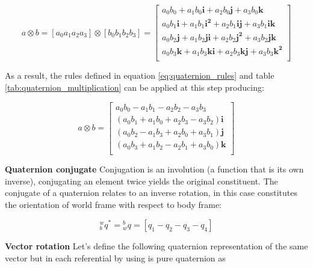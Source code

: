 \begin{equation}
    a \otimes b = \left[a_0 a_1 a_2 a_3\right] \otimes \left[b_0 b_1 b_2 b_3\right]     =
    \begin{bmatrix}
        a_0 b_0 + a_1 b_0\boldsymbol{i} + a_2 b_0\boldsymbol{j} + a_3 b_0\boldsymbol{k}                   \\
        a_0 b_1\boldsymbol{i} + a_1 b_1\boldsymbol{i^2} + a_2 b_1\boldsymbol{ij} + a_3 b_1\boldsymbol{ik} \\
        a_0 b_2\boldsymbol{j}+ a_1 b_2\boldsymbol{ji} + a_2 b_2\boldsymbol{j^2} + a_3 b_2\boldsymbol{jk}  \\
        a_0 b_3\boldsymbol{k} + a_1 b_3\boldsymbol{ki} + a_2 b_3\boldsymbol{kj} + a_3 b_3\boldsymbol{k^2} \\
    \end{bmatrix}
\end{equation}

As a result, the rules defined in equation \ref{eq:quaternion_rules} and table \ref{tab:quaternion_multiplication} can be applied at this step producing:

\begin{equation}
    a \otimes b =
    \begin{bmatrix}
        a_0 b_0 - a_1 b_1 - a_2 b_2 - a_3 b_3                 \\
        (a_0 b_1 + a_1 b_0 + a_2 b_3 - a_3 b_2)\boldsymbol{i} \\
        (a_0 b_2 - a_1 b_3 + a_2 b_0 + a_3 b_1)\boldsymbol{j} \\
        (a_0 b_3 + a_1 b_2 - a_2 b_1 + a_3 b_0)\boldsymbol{k} \\
    \end{bmatrix}
    \label{eq:quaternion_matrix}
\end{equation}

\item \textbf{Quaternion conjugate} Conjugation is an involution (a function that is its own inverse), conjugating an element twice yields the original constituent. The conjugate of a quaternion relates to an inverse rotation, in this case constitutes the orientation of world frame with respect to body frame:

\begin{equation}
    \textrm{$_{b}^{w}q$}^* =\textrm{$_{w}^{b}q$} = \left[q_1 - q_2 - q_3 - q_4\right]
\end{equation}

\item \textbf{Vector rotation} Let's define the following quaternion representation of the same vector but in each referential by using is pure quaternion as

